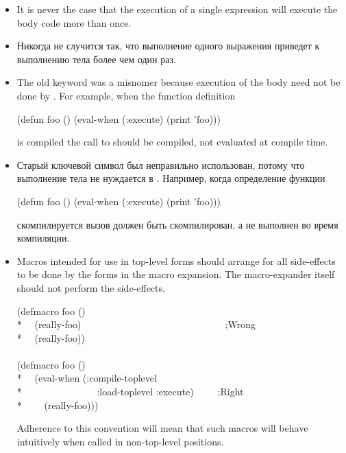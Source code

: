 \begin{newer}
\begin{defspec}
  \begin{itemize}
   \item It is never the case that the execution of a single 
     expression will execute the body code more than once.

   \item Никогда не случится так, что выполнение одного 
     выражения приведет к выполнению тела более чем один раз.

   \item The old keyword  was a misnomer because execution of
     the body need not be done by .  For example, when the
     function definition
     \begin{lisp}
     (defun foo () (eval-when (:execute) (print 'foo)))
     \end{lisp}
     is compiled
     the call to  should be compiled, not evaluated at compile time.

   \item Старый ключевой символ  был неправильно использован, потому
     что выполнение тела не нуждается в . Например, когда определение
     функции
     \begin{lisp}
     (defun foo () (eval-when (:execute) (print 'foo)))
     \end{lisp}
     скомпилируется
     вызов  должен быть скомпилирован, а не выполнен во время
     компиляции.

   \item Macros intended for use in top-level forms should arrange for all
     side-effects to be done by the forms in the macro expansion.
     The macro-expander itself should not perform the side-effects.

\begin{lisp}
(defmacro foo () \\*
~~(really-foo)~~~~~~~~~~~~~~~~~~~~~~~~~~~~~~;{\rm Wrong}\\*
~~{\Xbq}(really-foo)) \\
\\
(defmacro foo () \\*
~~{\Xbq}(eval-when (:compile-toplevel \\*
~~~~~~~~~~~~~~~:load-toplevel :execute)~~~~~;{\rm Right} \\*
~~~~(really-foo)))
\end{lisp}

     Adherence to this convention will mean that such macros will behave
     intuitively when called in non-top-level positions.   


\end{itemize}
\end{defspec}
\end{newer}
